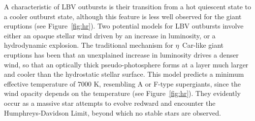 A characteristic of LBV outbursts is their transition from a hot
quiescent state to a cooler outburst state, although this feature is
less well observed for the giant eruptions (see Figure~\ref{fig:hr}).
Two potential models for LBV outbursts involve either an opaque
stellar wind driven by an increase in luminosity, or a hydrodynamic
explosion. The traditional mechanism for $\eta$~Car-like 
giant
eruptions has been that an unexplained increase in luminosity drives a
denser wind, so that an optically thick pseudo-photosphere forms at a
layer much larger and cooler than the hydrostatic stellar
surface\cite{Davidson87}. This model predicts a minimum effective
temperature of 7000 K, resembling A or F-type
supergiants\cite{Humphreys94,Smith04}, since the wind opacity depends
on the temperature (see Figure~\ref{fig:hr}). They evidently occur as
a massive star attempts to evolve redward and encounter the
Humphreys-Davidson Limit\cite{Davidson87}, beyond which no stable
stars are observed.




